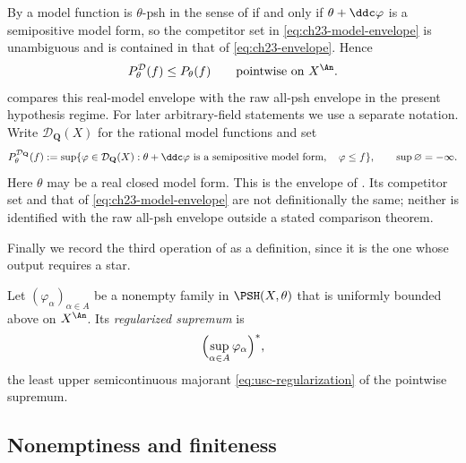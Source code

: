 By  a model function is \(\theta\)-psh in
the sense of  if and only if \(\theta+\ddc\varphi\) is
a semipositive model form, so the competitor set in
\eqref{eq:ch23-model-envelope} is unambiguous and is contained in that of
\eqref{eq:ch23-envelope}.  Hence
\begin{equation}\label{eq:ch23-model-envelope-below}
 P^{\mathcal D}_\theta(f)\leq P_\theta(f)
 \qquad\text{pointwise on }X^{\An}.
\end{equation}
 compares this real-model
envelope with the raw all-psh envelope in the present hypothesis regime.
For later arbitrary-field statements we use a separate notation.  Write
\(\mathcal D_{\mathbf Q}(X)\) for the rational model functions and set
\[
 P^{\mathcal D_{\mathbf Q}}_\theta(f)
 :=\sup\{\varphi\in\mathcal D_{\mathbf Q}(X):
       \theta+\ddc\varphi\text{ is a semipositive model form},\quad
       \varphi\leq f\},\qquad \sup\varnothing=-\infty.
\]
Here \(\theta\) may be a real closed model form.  This is the envelope
of \cite[\S\S2.2--2.8]{GJKM19}.  Its competitor set and that of
\eqref{eq:ch23-model-envelope} are not definitionally the same; neither
is identified with the raw all-psh envelope outside a stated comparison
theorem.

Finally we record the third operation of  as a
definition, since it is the one whose output requires a star.

\begin{definition}
\label{def:ch23-regularized-sup}
Let \((\varphi_\alpha)_{\alpha\in A}\) be a nonempty family in
\(\PSH(X,\theta)\) that is uniformly bounded above on \(X^{\An}\).  Its
\emph{regularized supremum} is
\begin{equation}\label{eq:ch23-regularized-sup}
 \Bigl(\sup_{\alpha\in A}\varphi_\alpha\Bigr)^{*},
\end{equation}
the least upper semicontinuous majorant \eqref{eq:usc-regularization} of the
pointwise supremum.
\end{definition}

\subsection{Nonemptiness and finiteness}
\label{sec:ch23-finiteness}

